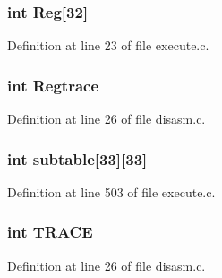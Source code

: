 \subsubsection[{Reg}]{\setlength{\rightskip}{0pt plus 5cm}int Reg[32]}\label{execute_8c_a6f68e5248211a0505dc97d8ac59a0ae5}


Definition at line 23 of file execute.\+c.

\subsubsection[{Regtrace}]{\setlength{\rightskip}{0pt plus 5cm}int Regtrace}\label{execute_8c_a38daff3d696277a81716a8200f659a21}


Definition at line 26 of file disasm.\+c.

\subsubsection[{subtable}]{\setlength{\rightskip}{0pt plus 5cm}int subtable[33][33]}\label{execute_8c_a32c5902d8d4ace553cf3bcc75e8e6a78}


Definition at line 503 of file execute.\+c.

\subsubsection[{T\+R\+A\+CE}]{\setlength{\rightskip}{0pt plus 5cm}int T\+R\+A\+CE}\label{execute_8c_a231cbc535bda364aa70c8d0617211a65}


Definition at line 26 of file disasm.\+c.

